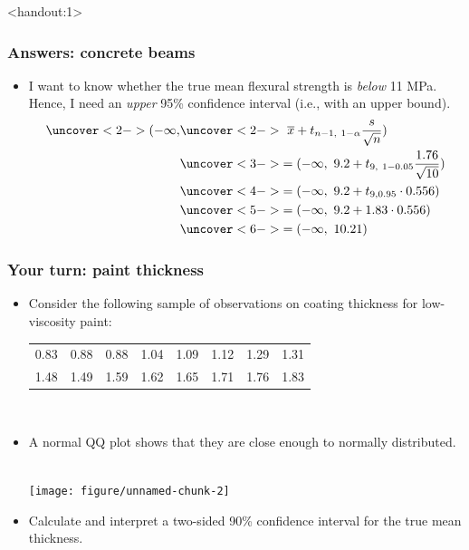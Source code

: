 \documentclass[handout]{beamer}\usepackage{graphicx, color}
\newenvironment{knitrout}{}{} %
\newcommand{\answers}{1}
\providecommand{\ov}[1]{\overline{#1}}
\providecommand{\q}{$\quad$ \newline}
\numberwithin{equation}{section}
\begin{document}
\begin{frame}<handout:\answers>
\frametitle{Answers: concrete beams}
\begin{itemize}
\item I want to know whether the true mean flexural strength is \emph{below} 11 MPa. Hence, I need an \emph{upper} 95\% confidence interval (i.e., with an upper bound). 
\begin{align*}
\uncover<2->{(-\infty,} &\uncover<2->{\ \ov{x} + t_{n - 1, \ 1- \alpha } \frac{s}{\sqrt{n}})} \\
&\uncover<3->{= (-\infty, \ 9.2 + t_{9, \ 1- 0.05 } \frac{1.76}{\sqrt{10}})} \\
&\uncover<4->{= (-\infty, \ 9.2 + t_{9, 0.95} \cdot 0.556)} \\
&\uncover<5->{= (-\infty, \ 9.2 + 1.83 \cdot 0.556)} \\
&\uncover<6->{= (-\infty, \ 10.21)}
\end{align*}
 
\end{itemize}
\end{frame}


\begin{frame}
\frametitle{Your turn: paint thickness} \scriptsize
\begin{itemize}
\item Consider the following sample of observations on coating thickness for low-viscosity paint: \q
\begin{tabular}{cccccccc}
0.83 & 0.88 & 0.88 & 1.04 & 1.09 & 1.12 & 1.29 & 1.31 \\
1.48 & 1.49 & 1.59 & 1.62 & 1.65 & 1.71 & 1.76 & 1.83
\end{tabular} \q
\item A normal QQ plot shows that they are close enough to normally distributed. \q 
\begin{center}
\begin{knitrout}
\color{fgcolor}
\texttt{[image: figure/unnamed-chunk-2]} 

\end{knitrout}

\end{center}
\item Calculate and interpret a two-sided 90\% confidence interval for the true mean thickness.
\end{itemize}
\end{frame}
\end{document}
